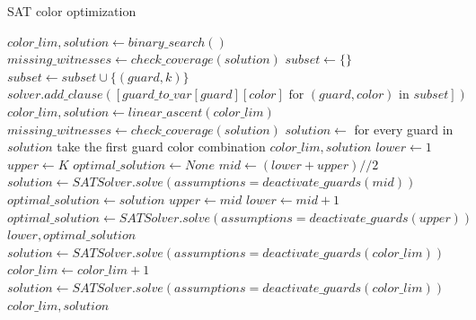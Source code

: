 \begin{algorithm}
\caption{SAT color optimization}\label{alg:SAT_color_opt}
\begin{algorithmic}[1]
    \State $color\_lim, solution \gets binary\_search()$
    \State $missing\_witnesses \gets check\_coverage(solution)$
            \State $subset \gets \{\}$
                    \State $subset\gets subset\cup \{(guard, k)\}$
                \EndFor
            \EndFor
            \State $solver.add\_clause([guard\_to\_var[guard][color] \text{ for } (guard, color) \text{ in } subset])$
        \EndFor
        \State $color\_lim, solution \gets linear\_ascent(color\_lim)$
        \State $missing\_witnesses \gets check\_coverage(solution)$
    \EndWhile
    \State $solution \gets$ for every guard in $solution$ take the first guard color combination
    \State \Return $color\_lim, solution$
\EndProcedure
{}
    \State $lower \gets 1$
    \State $upper \gets K$
    \State $optimal\_solution \gets None$
        \State $mid \gets (lower + upper) // 2$
        \State $solution \gets SATSolver.solve(assumptions=deactivate\_guards(mid))$
            \State $optimal\_solution \gets solution$
            \State $upper \gets mid$
        \Else
            \State $lower \gets mid + 1$
        \EndIf
    \EndWhile
        \State $optimal\_solution \gets SATSolver.solve(assumptions=deactivate\_guards(upper))$
    \EndIf
    \State \Return $lower, optimal\_solution$
\EndProcedure
{}
    \State $solution \gets SATSolver.solve(assumptions=deactivate\_guards(color\_lim))$
        \State $color\_lim \gets color\_lim + 1$
        \State $solution \gets SATSolver.solve(assumptions=deactivate\_guards(color\_lim))$
    \EndWhile
    \State \Return $color\_lim, solution$
\EndProcedure
\end{algorithmic}
\end{algorithm}

